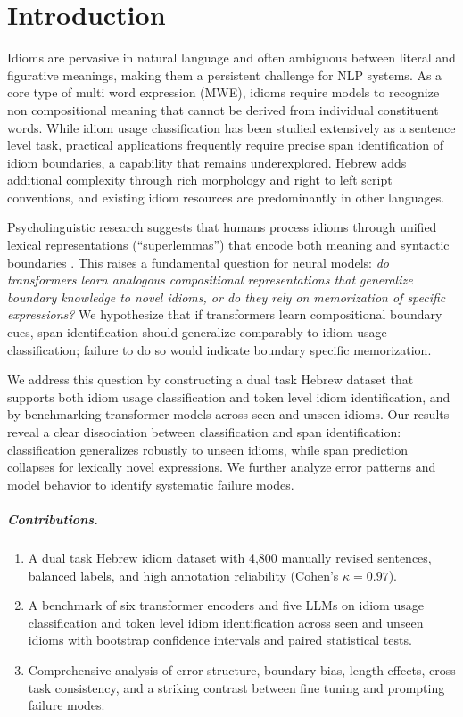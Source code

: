 \documentclass[11pt, a4paper]{report}
\begin{document}

\chapter{Introduction}

Idioms are pervasive in natural language and often ambiguous between literal and figurative meanings, making them a persistent challenge for NLP systems. As a core type of multi word expression (MWE), idioms require models to recognize non compositional meaning that cannot be derived from individual constituent words. While idiom usage classification has been studied extensively as a sentence level task, practical applications frequently require precise span identification of idiom boundaries, a capability that remains underexplored. Hebrew adds additional complexity through rich morphology and right to left script conventions, and existing idiom resources are predominantly in other languages.

Psycholinguistic research suggests that humans process idioms through unified lexical representations (``superlemmas'') that encode both meaning and syntactic boundaries \citep{sprenger2006lexical}. This raises a fundamental question for neural models: \textit{do transformers learn analogous compositional representations that generalize boundary knowledge to novel idioms, or do they rely on memorization of specific expressions?} We hypothesize that if transformers learn compositional boundary cues, span identification should generalize comparably to idiom usage classification; failure to do so would indicate boundary specific memorization.

We address this question by constructing a dual task Hebrew dataset that supports both idiom usage classification and token level idiom identification, and by benchmarking transformer models across seen and unseen idioms. Our results reveal a clear dissociation between classification and span identification: classification generalizes robustly to unseen idioms, while span prediction collapses for lexically novel expressions. We further analyze error patterns and model behavior to identify systematic failure modes.

\paragraph{Contributions.}
\begin{enumerate}
    \item A dual task Hebrew idiom dataset with 4,800 manually revised sentences, balanced labels, and high annotation reliability (Cohen's $\kappa = 0.97$).
    \item A benchmark of six transformer encoders and five LLMs on idiom usage classification and token level idiom identification across seen and unseen idioms with bootstrap confidence intervals and paired statistical tests.
    \item Comprehensive analysis of error structure, boundary bias, length effects, cross task consistency, and a striking contrast between fine tuning and prompting failure modes.
\end{enumerate}
\end{document}
